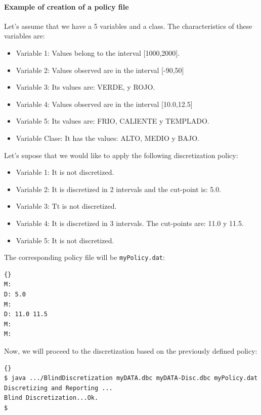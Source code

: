 \paragraph{Example of creation of a policy file}
Let's assume that we have a 5 variables and a class. The characteristics of these variables are:
\begin{itemize}
	\item	Variable 1: Values belong to the interval [1000,2000].
	\item	Variable 2: Values observed are in the interval [-90,50]
	\item	Variable 3: Its values are: VERDE, y ROJO.
	\item	Variable 4: Values observed are in the interval [10.0,12.5]
	\item	Variable 5: Its values are: FRIO, CALIENTE y TEMPLADO.
	\item	Variable Clase: It has the values: ALTO, MEDIO y BAJO.
\end{itemize}

Let's supose  that we would like to apply the following discretization policy:
\begin{itemize}
	\item	Variable 1: It is not discretized.
	\item	Variable 2: It is discretized in 2 intervals and the cut-point is: 5.0.
	\item	Variable 3: Tt is not discretized.
	\item	Variable 4: It is discretized in 3 intervals. The cut-points are: 11.0 y 11.5.
	\item	Variable 5: It is not discretized.
\end{itemize}


The corresponding policy file will be \verb=myPolicy.dat=:

\begin{lstlisting}[frame=trBL, caption=myPolicy.dat, label=PolicyEx]{}
M:
D: 5.0
M:
D: 11.0 11.5
M:
M:
\end{lstlisting}

Now, we will proceed to the discretization based on the previously defined policy:

\begin{lstlisting}[frame=trBL, caption=Running Example, label=PolicyRunEx]{}
$ java .../BlindDiscretization myDATA.dbc myDATA-Disc.dbc myPolicy.dat
Discretizing and Reporting ...
Blind Discretization...Ok.
$
\end{lstlisting}

